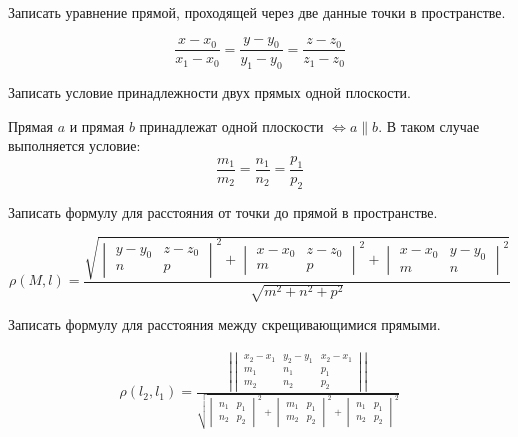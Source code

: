 \begin{question}
  Записать уравнение прямой, проходящей через две данные точки в пространстве.
\end{question}
\begin{answer}
  \[
    \frac{x - x_0}{x_1 - x_0} = \frac{y - y_0}{y_1 - y_0} = \frac{z - z_0}{z_1 - z_0}
  \] 
\end{answer}


\begin{question}
  Записать условие принадлежности двух прямых одной плоскости.
\end{question}
\begin{answer}
  Прямая $a$ и прямая $b$ принадлежат одной плоскости $\iff a \parallel b$.
  В таком случае выполняется условие: \[
    \frac{m_1}{m_2} = \frac{n_1}{n_2} = \frac{p_1}{p_2}  
  \] 
\end{answer}

\begin{question}
  Записать формулу для расстояния от точки до прямой в пространстве.
\end{question}
\begin{answer}
  \[
  \rho(M, l) = 
  \frac{\sqrt{
  \begin{vmatrix}
    y- y_0 & z - z_0 \\
    n & p
  \end{vmatrix}^2 +
  \begin{vmatrix}
    x - x_0 & z - z_0 \\
    m & p
  \end{vmatrix}^2 +
  \begin{vmatrix}
    x - x_0 & y - y_0 \\
    m & n
  \end{vmatrix}^2
  }}{\sqrt{m^2 + n^2 + p^2}} 
  \] 
\end{answer}


\begin{question}
  Записать формулу для расстояния между скрещивающимися прямыми. 
\end{question}
\begin{answer}
  \begin{gather*}
    \rho(l_2, l_1) = 
    \frac{
      \left|
      \begin{vmatrix}
        x_2 - x_1 & y_2 - y_1 & x_2 - x_1 \\
        m_1 & n_1 & p_1 \\
        m_2 & n_2 & p_2
      \end{vmatrix}
    \right| 
    }{
      \sqrt{
        \begin{vmatrix}
          n_1 & p_1 \\
          n_2 & p_2
        \end{vmatrix}^2 +
        \begin{vmatrix}
          m_1 & p_1 \\
          m_2 & p_2
        \end{vmatrix}^2 +  
        \begin{vmatrix}
          n_1 & p_1 \\
          n_2 & p_2
        \end{vmatrix}^2 
      }
    }
  \end{gather*}
\end{answer}

